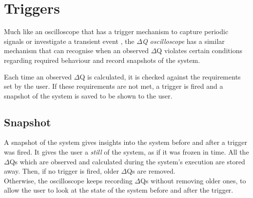 \section{Triggers}
    Much like an oscilloscope that has a trigger mechanism to capture periodic signals or investigate a transient event \cite{osc-t}, the \textit{$\Delta$Q oscilloscope} has a similar mechanism that can recognise when an observed $\Delta$Q violates certain conditions regarding required behaviour and record snapshots of the system.

    Each time an observed $\Delta$Q is calculated, it is checked against the requirements set by the user. If these requirements are not met, a trigger is fired and a snapshot of the system is saved to be shown to the user. 
    
    \subsection{Snapshot}
    A snapshot of the system gives insights into the system before and after a trigger was fired. It gives the user a \textit{still} of the system, as if it was frozen in time. All the $\Delta$Qs which are observed and calculated during the system's execution are stored away. Then, if no trigger is fired, older $\Delta$Qs are removed. \\
    Otherwise, the oscilloscope keeps recording $\Delta$Qs without removing older ones, to allow the user to look at the state of the system before and after the trigger.
    
